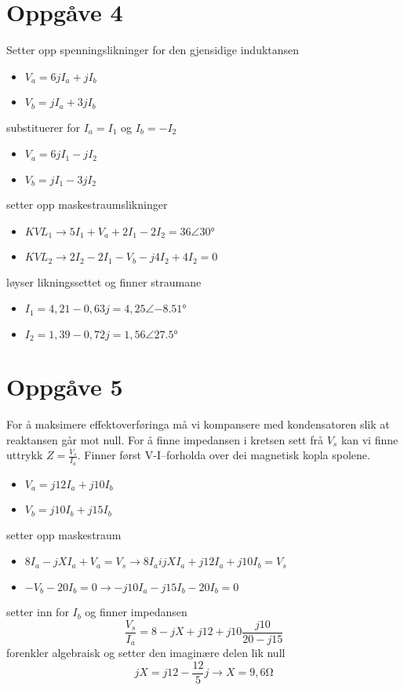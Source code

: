 \documentclass[12pt,a4paper]{article}
\begin{document}
  \section*{Oppgåve 4}
    Setter opp spenningslikninger for den gjensidige induktansen
    \begin{itemize}
      \item $V_a = 6jI_a + jI_b$
      \item $V_b = jI_a + 3jI_b$
    \end{itemize}
    substituerer for $I_a = I_1$ og $I_b = -I_2$
    \begin{itemize}
      \item $V_a = 6jI_1 - jI_2$
      \item $V_b = jI_1 - 3jI_2$
    \end{itemize}
    setter opp maskestraumslikninger
    \begin{itemize}
      \item $KVL_1 \rightarrow 5I_1 + V_a + 2I_1 - 2I_2 = 36 \angle \ang{30}$
      \item $KVL_2 \rightarrow 2I_2 - 2I_1 - V_b - j4I_2 + 4I_2 = 0$
    \end{itemize}
    løyser likningssettet og finner straumane
    \begin{itemize}
      \item $I_1 = 4,21 - 0,63j = 4,25\angle\ang{-8,51}$
      \item $I_2 = 1,39 - 0,72j = 1,56\angle\ang{27,5}$
    \end{itemize}

  \section*{Oppgåve 5}
    For å maksimere effektoverføringa må vi kompansere med kondensatoren slik at reaktansen
    går mot null. For å finne impedansen i kretsen sett frå $V_s$ kan vi finne uttrykk
    $Z = \frac{V_s}{I_a}$. Finner først V-I--forholda over dei magnetisk kopla spolene.
    \begin{itemize}
      \item $V_a = j12I_a + j10I_b$
      \item $V_b = j10I_b + j15I_b$
    \end{itemize}
    setter opp maskestraum
    \begin{itemize}
      \item $8I_a -jXI_a + V_a = V_s \rightarrow 8I_a ijXI_a + j12I_a +j10I_b = V_s$
      \item $-V_b -20I_b = 0 \rightarrow -j10I_a -j15I_b -20I_b = 0$
    \end{itemize}
    setter inn for $I_b$ og finner impedansen
    \begin{equation}
      \frac{V_s}{I_a} = 8 - jX + j12 + j10\frac{j10}{20-j15}
    \end{equation}
    forenkler algebraisk og setter den imaginære delen lik null
    \begin{equation}
      jX = j12 - \frac{12}{5}j \rightarrow X = 9,6 \si{\ohm}
    \end{equation}
\end{document}
